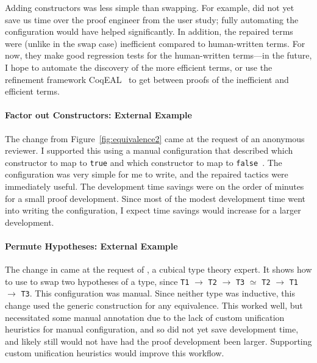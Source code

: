 Adding constructors was less simple than swapping.
For example, \toolnamec did not yet save us time over the proof engineer from the user study;
fully automating the configuration would have helped significantly.
In addition, the repaired terms were (unlike in the swap case) inefficient compared to human-written terms.
For now, they make good regression tests for the human-written terms---in the future,
I hope to automate the discovery of the more efficient terms,
or use the refinement framework CoqEAL~\cite{cohen:hal-01113453}
to get between proofs of the inefficient and efficient terms.

\paragraph{Factor out Constructors: External Example}
The change from Figure~\ref{fig:equivalence2} came at the request of an anonymous reviewer.
I supported this using a manual configuration that described which constructor to map to \lstinline{true}
and which constructor to map to \lstinline{false}~\href{https://github.com/uwplse/pumpkin-pi/blob/v2.0.0/plugin/coq/playground/constr_refactor.v}{}.
The configuration was very simple for me to write, and the repaired tactics were immediately useful.
The development time savings were on the order of minutes for a small proof development.
Since most of the modest development time went into writing the configuration,
I expect time savings would increase for a larger development.

\paragraph{Permute Hypotheses: External Example}
The change in \href{https://github.com/uwplse/pumpkin-pi/blob/v2.0.0/plugin/coq/playground/flip.v}{} came at the request of ,
a cubical type theory expert.
It shows how to use \toolnamec to swap two hypotheses of a type, since \lstinline{T1} $\rightarrow$ \lstinline{T2} $\rightarrow$ \lstinline{T3} $\simeq$
\lstinline{T2} $\rightarrow$ \lstinline{T1} $\rightarrow$ \lstinline{T3}.
This configuration was manual.
Since neither type was inductive, this change used the generic construction for any equivalence.
This worked well, but necessitated some manual annotation due to the lack of custom unification heuristics for 
manual configuration, and so did not yet save development time, and likely still would not have had the proof development been larger.
Supporting custom unification heuristics would improve this workflow.

